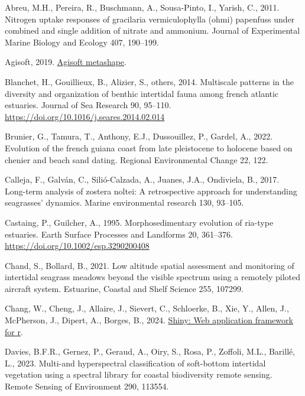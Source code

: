 \documentclass[
  letterpaper,
  DIV=11,
  numbers=noendperiod]{scrartcl}
\newlength{\cslhangindent}
\newenvironment{CSLReferences}[2] %
 {\begin{list}{}{%
  \setlength{\itemindent}{0pt}
  \setlength{\leftmargin}{0pt}
  \setlength{\parsep}{0pt}
  \ifodd #1
   \setlength{\leftmargin}{\cslhangindent}
   \setlength{\itemindent}{-1\cslhangindent}
  \fi
  \setlength{\itemsep}{#2\baselineskip}}}
 {\end{list}}
\begin{document}
\label{refs}
\begin{CSLReferences}{1}{0}
Abreu, M.H., Pereira, R., Buschmann, A., Sousa-Pinto, I., Yarish, C.,
2011. Nitrogen uptake responses of gracilaria vermiculophylla (ohmi)
papenfuss under combined and single addition of nitrate and ammonium.
Journal of Experimental Marine Biology and Ecology 407, 190--199.

Agisoft, 2019. \href{https://www.agisoft.com/}{Agisoft metashape}.

Blanchet, H., Gouillieux, B., Alizier, S., others, 2014. Multiscale
patterns in the diversity and organization of benthic intertidal fauna
among french atlantic estuaries. Journal of Sea Research 90, 95--110.
\url{https://doi.org/10.1016/j.seares.2014.02.014}

Brunier, G., Tamura, T., Anthony, E.J., Dussouillez, P., Gardel, A.,
2022. Evolution of the french guiana coast from late pleistocene to
holocene based on chenier and beach sand dating. Regional Environmental
Change 22, 122.

Calleja, F., Galván, C., Silió-Calzada, A., Juanes, J.A., Ondiviela, B.,
2017. Long-term analysis of zostera noltei: A retrospective approach for
understanding seagrasses' dynamics. Marine environmental research 130,
93--105.

Castaing, P., Guilcher, A., 1995. Morphosedimentary evolution of
ria-type estuaries. Earth Surface Processes and Landforms 20, 361--376.
\url{https://doi.org/10.1002/esp.3290200408}

Chand, S., Bollard, B., 2021. Low altitude spatial assessment and
monitoring of intertidal seagrass meadows beyond the visible spectrum
using a remotely piloted aircraft system. Estuarine, Coastal and Shelf
Science 255, 107299.

Chang, W., Cheng, J., Allaire, J., Sievert, C., Schloerke, B., Xie, Y.,
Allen, J., McPherson, J., Dipert, A., Borges, B., 2024.
\href{https://CRAN.R-project.org/package=shiny}{Shiny: Web application
framework for r}.

Davies, B.F.R., Gernez, P., Geraud, A., Oiry, S., Rosa, P., Zoffoli,
M.L., Barillé, L., 2023. Multi-and hyperspectral classification of
soft-bottom intertidal vegetation using a spectral library for coastal
biodiversity remote sensing. Remote Sensing of Environment 290, 113554.


\end{CSLReferences}
\end{document}
